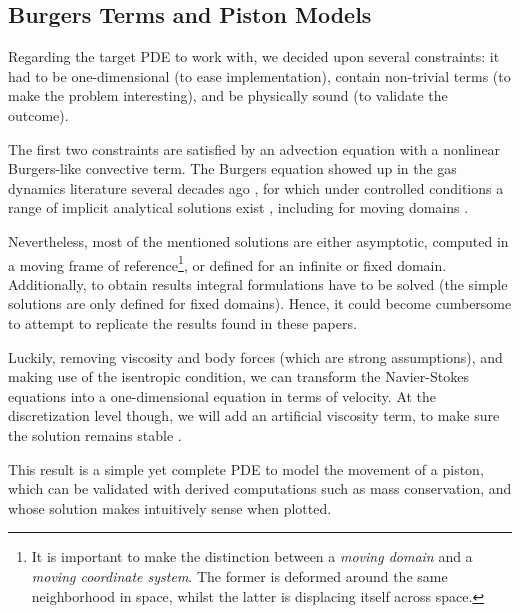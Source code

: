 \subsection{Burgers Terms and Piston Models}
Regarding the target PDE to work with, we decided upon several constraints:
it had to be one-dimensional (to ease implementation), 
contain non-trivial terms (to make the problem interesting),
and be physically sound (to validate the outcome).

The first two constraints are satisfied by an advection equation with 
a nonlinear Burgers-like convective term.
The Burgers equation showed up in the gas dynamics literature several decades ago
\cite{BURGERS1948171,
moran_shen_1966,
1969nonlinearWavePropagationInARelaxingGas,
1951_quasiLinearParabolicEquationOcuringAerodynamics},
for which under controlled conditions 
a range of implicit analytical solutions exist \cite{1972_TableSolutionsBurgers},
including for moving domains \cite{2000_burgersMovingDomainAnalytical}.

Nevertheless, most of the mentioned solutions are either asymptotic,
computed in a moving frame of reference\footnote{
    It is important to make the distinction between a \textit{moving domain}
    and a \textit{moving coordinate system}.
    The former is deformed around the same neighborhood in space,
    whilst the latter is displacing itself across space.
}, 
or defined for an infinite or fixed domain.
Additionally, to obtain results integral formulations have to be solved 
(the simple solutions are only defined for fixed domains).
Hence, it could become cumbersome to attempt to replicate
the results found in these papers.

Luckily, removing viscosity and body forces (which are strong assumptions), 
and making use of the isentropic condition,
we can transform the Navier-Stokes equations 
into a one-dimensional equation \cite{1860_Earnshow, nonlinearDiffusiveWaves}
in terms of velocity.
At the discretization level though, 
we will add an artificial viscosity term,
to make sure the solution remains stable \cite{2011_artificialViscosityPOD}.

This result is a simple yet complete PDE to model the movement of a piston, 
which can be validated with derived computations such as mass conservation,
and whose solution makes intuitively sense when plotted.

